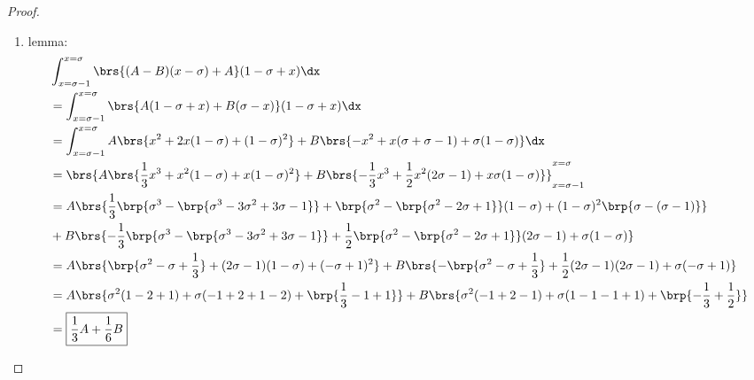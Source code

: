 \begin{proof}
\begin{enumerate}
  \item lemma: \label{ilem:stromberg_AB}
    \begin{align*}
        &\int_{x=\sigma-1}^{x=\sigma}   \brs{ (A-B)(x-\sigma)+A           } (1-\sigma+x)    \dx
    \\&= \int_{x=\sigma-1}^{x=\sigma}   \brs{ A(1-\sigma+x) + B(\sigma-x) } (1-\sigma+x)    \dx
    \\&= \int_{x=\sigma-1}^{x=\sigma}  A\brs{ x^2 + 2x(1-\sigma)        + (1-\sigma)^2    }
                                     + B\brs{-x^2 +  x(\sigma+\sigma-1) + \sigma(1-\sigma)} \dx
    \\&= \brs{ A\brs{ \frac{1}{3}x^3 +             x^2(1-\sigma ) + x(1-\sigma)^2    }
             + B\brs{-\frac{1}{3}x^3 + \frac{1}{2} x^2(2\sigma-1) + x\sigma(1-\sigma)}
             }_{x=\sigma-1}^{x=\sigma}
    \\&= A\brs{ \frac{1}{3}\brp{\sigma^3-\brp{\sigma^3-3\sigma^2+3\sigma-1}} +            \brp{\sigma^2-\brp{\sigma^2-2\sigma+1}}(1-\sigma ) + (1-\sigma)^2\brp{\sigma-(\sigma-1)} }
    \\&+ B\brs{-\frac{1}{3}\brp{\sigma^3-\brp{\sigma^3-3\sigma^2+3\sigma-1}} + \frac{1}{2}\brp{\sigma^2-\brp{\sigma^2-2\sigma+1}}(2\sigma-1) + \sigma(1-\sigma)                    }
    \\&= A\brs{ \brp{\sigma^2 - \sigma + \frac{1}{3} } +            (2\sigma-1)(1-\sigma ) + (-\sigma+1)^2     }
       + B\brs{-\brp{\sigma^2 - \sigma + \frac{1}{3} } + \frac{1}{2}(2\sigma-1)(2\sigma-1) + \sigma(-\sigma+1) }
    \\&= A\brs{\sigma^2( 1-2+1) + \sigma(-1+2+1-2) + \brp{ \frac{1}{3}-1+1}}
       + B\brs{\sigma^2(-1+2-1) + \sigma( 1-1-1+1) + \brp{-\frac{1}{3}+\frac{1}{2}}}
    \\&= \boxed{\frac{1}{3}A + \frac{1}{6}B}
    \end{align*}


\end{enumerate}
\end{proof}
